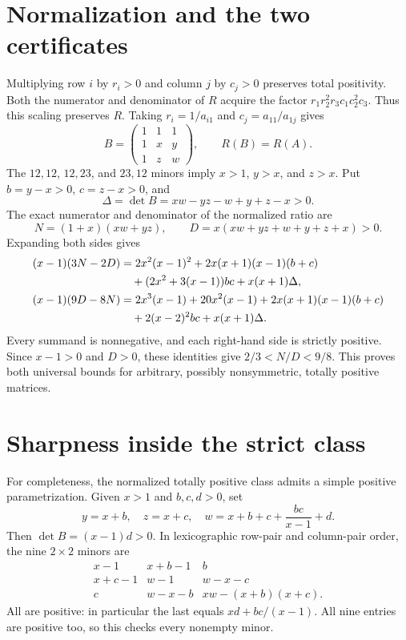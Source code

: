 \documentclass[11pt]{article}
\begin{document}
\section{Normalization and the two certificates}
Multiplying row $i$ by $r_i>0$ and column $j$ by $c_j>0$ preserves total
positivity. Both the numerator and denominator of $R$ acquire the factor
$r_1r_2^2r_3c_1c_2^2c_3$. Thus this scaling preserves $R$.
Taking $r_i=1/a_{i1}$ and $c_j=a_{11}/a_{1j}$ gives
\[
 B=\begin{pmatrix}1&1&1\\1&x&y\\1&z&w\end{pmatrix},\qquad R(B)=R(A).
\]
The $12,12$, $12,23$, and $23,12$ minors imply $x>1$, $y>x$, and $z>x$.
Put $b=y-x>0$, $c=z-x>0$, and
\[
 \Delta=\det B=xw-yz-w+y+z-x>0.
\]
The exact numerator and denominator of the normalized ratio are
\[
 N=(1+x)(xw+yz),\qquad D=x(xw+yz+w+y+z+x)>0.
\]
Expanding both sides gives
\begin{align}
(x-1)(3N-2D)
 &=2x^2(x-1)^2+2x(x+1)(x-1)(b+c)\notag\\
 &\quad +(2x^2+3(x-1))bc+x(x+1)\Delta,\label{lower}\\
(x-1)(9D-8N)
 &=2x^3(x-1)+20x^2(x-1)+2x(x+1)(x-1)(b+c)\notag\\
 &\quad +2(x-2)^2bc+x(x+1)\Delta.\label{upper}
\end{align}
Every summand is nonnegative, and each right-hand side is strictly positive.
Since $x-1>0$ and $D>0$, these identities give $2/3<N/D<9/8$.
This proves both universal bounds for arbitrary, possibly nonsymmetric,
totally positive matrices.

\section{Sharpness inside the strict class}
For completeness, the normalized totally positive class admits a simple
positive parametrization. Given $x>1$ and $b,c,d>0$, set
\[
 y=x+b,\quad z=x+c,\quad w=x+b+c+\frac{bc}{x-1}+d.
\]
Then $\det B=(x-1)d>0$. In lexicographic row-pair and column-pair order,
the nine $2\times2$ minors are
\[
\begin{array}{ccc}
 x-1&x+b-1&b\\
 x+c-1&w-1&w-x-c\\
 c&w-x-b&xw-(x+b)(x+c).
\end{array}
\]
All are positive: in particular the last equals $xd+bc/(x-1)$.
All nine entries are positive too, so this checks every nonempty minor.
\end{document}
